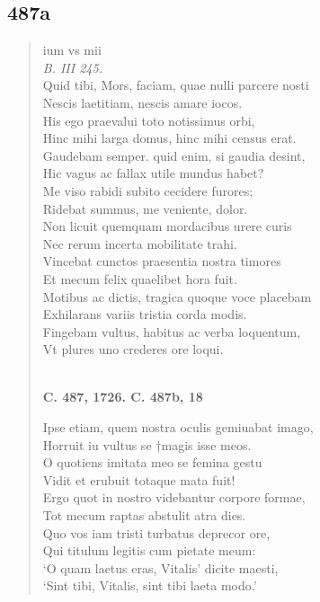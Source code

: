 \documentclass[11pt, a4paper]{report}
\begin{document}
            \subsection*{487a}
      \begin{verse}
      ium vs mii \\ \textit{B. III 245.} \\ Quid tibi, Mors, faciam, quae nulli parcere nosti \\ Nescis laetitiam, nescis amare iocos. \\ His ego praevalui toto notissimus orbi, \\ Hinc mihi larga domus, hinc mihi census erat. \\ Gaudebam semper. quid enim, si gaudia desint, \\ Hic vagus ac fallax utile mundus habet? \\ Me viso rabidi subito cecidere furores; \\ Ridebat summus, me veniente, dolor. \\ Non licuit quemquam mordacibus urere curis \\ Nec rerum incerta mobilitate trahi. \\ Vincebat cunctos praesentia nostra timores \\ Et mecum felix quaelibet hora fuit. \\ Motibus ac dictis, tragica quoque voce placebam \\ Exhilarans variis tristia corda modis. \\ Fingebam vultus, habitus ac verba loquentum, \\ Vt plures uno crederes ore loqui. \\ 
        ﻿\pagebreak 
    \begin{center} \textbf{C. 487, 1726. C. 487b, 18} \end{center} \marginpar{[39]} Ipse etiam, quem nostra oculis gemiuabat imago, \\ Horruit iu vultus se †magis isse meos. \\ O quotiens imitata meo se femina gestu \\ Vidit et erubuit totaque mata fuit! \\ Ergo quot in nostro videbantur corpore formae, \\ Tot mecum raptas abstulit atra dies. \\ Quo vos iam tristi turbatus deprecor ore, \\ Qui titulum legitis cum pietate meum: \\ ‘O quam laetus eras, Vitalis’ dicite maesti, \\ ‘Sint tibi, Vitalis, sint tibi laeta modo.’ \\ 
      \end{verse}
  
\end{document}
